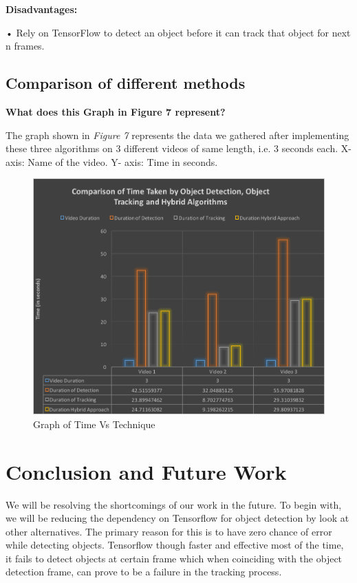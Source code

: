 \documentclass[10pt,twocolumn,letterpaper]{article}
\begin{document}
\textbf{Disadvantages:}

•	Rely on TensorFlow to detect an object before it can track that object for next n frames.

\subsection{Comparison of different methods}

\textbf{What does this Graph in Figure 7 represent?}

The graph shown in \textit{Figure 7} represents the data we gathered after implementing these three algorithms on 3 different videos of same length, i.e. 3 seconds each.  
X-axis: Name of the video.
Y- axis: Time in seconds.


\begin{figure}
\includegraphics[width=\linewidth]{Graph.png}
\caption{Graph of Time Vs Technique}
\end{figure}
  
 

\section{Conclusion and Future Work}
We will be resolving the shortcomings of our work in the future. To begin with, we will be reducing the dependency on Tensorflow for object detection by look at other alternatives. The primary reason for this is to have zero chance of error while detecting objects. Tensorflow though faster and effective most of the time, it fails to detect objects at certain frame which when coinciding with the object detection frame, can prove to be a failure in the tracking process.
\end{document}
